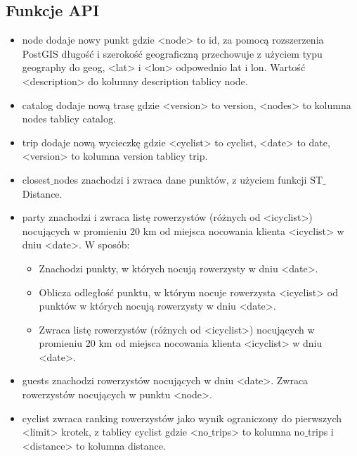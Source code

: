 \documentclass[12pt]{article}
\begin{document}
\subsection*{Funkcje API}
\begin{itemize}
  \item node dodaje nowy punkt gdzie <node> to id, za pomocą rozszerzenia PostGIS długość i szerokość geograficzną przechowuje z użyciem typu geography do geog, <lat> i <lon> odpowednio lat i lon. Wartość <description> do kolumny description tablicy node. 
  \item catalog dodaje nową trasę gdzie <version> to version, <nodes> to kolumna nodes tablicy catalog. 
  \item trip dodaje nową wycieczkę gdzie <cyclist> to cyclist, <date> to date, <version> to kolumna version tablicy trip.
  \item closest$\_$nodes znachodzi i zwraca dane punktów, z użyciem funkcji ST$\_$Distance. 
  \item party znachodzi i zwraca listę rowerzystów (różnych od <icyclist>) nocujących w promieniu 20 km od miejsca nocowania klienta <icyclist> w dniu <date>. W sposób:
  \begin{itemize}
  	\item Znachodzi punkty, w których nocują rowerzysty w dniu <date>.
  	\item Oblicza odległość punktu, w którym nocuje rowerzysta <icyclist> od punktów w których nocują rowerzysty w dniu <date>. 
  	\item Zwraca listę rowerzystów (różnych od <icyclist>) nocujących w promieniu 20 km od miejsca nocowania klienta <icyclist> w dniu <date>.
  \end{itemize}
 \item guests znachodzi rowerzystów nocujących w dniu <date>. Zwraca rowerzystów nocujących w punktu <node>.
 \item cyclist zwraca ranking rowerzystów jako wynik ograniczony do pierwszych <limit> krotek, z tablicy cyclist gdzie <no$\_$trips> to kolumna no$\_$trips i <distance> to kolumna distance.
\end{itemize}
\end{document}
